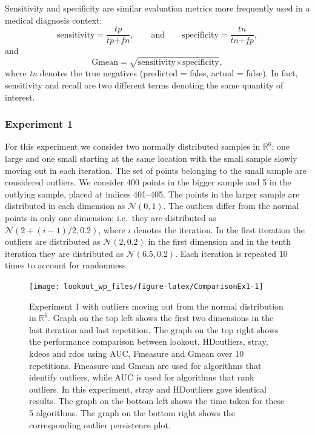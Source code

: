 \documentclass[11pt,a4paper,]{article}
\theoremstyle{definition}
\theoremstyle{definition}
\theoremstyle{definition}
\theoremstyle{remark}
\begin{document}
Sensitivity and specificity are similar evaluation metrics more frequently used in a medical diagnosis context:
\begin{equation}\label{eq:ss}
    \text{sensitivity} = \frac{ \textit{tp} }{\textit{tp} + \textit{fn}}  , \qquad \text{and} \qquad \text{specificity} = \frac{\textit{tn}}{\textit{tn} + \textit{fp}}  ,
\end{equation}
and
\begin{equation}\label{eq:gmean}
    \text{Gmean} = \sqrt{ \text{sensitivity} \times \text{specificity}}  ,
\end{equation}
where \emph{tn} denotes the true negatives (predicted = false, actual = false). In fact, sensitivity and recall are two different terms denoting the same quantity of interest.

\hypertarget{experiment-1}{%
\subsubsection*{Experiment 1}\label{experiment-1}}

For this experiment we consider two normally distributed samples in \(\mathbb{R}^6\); one large and one small starting at the same location with the small sample slowly moving out in each iteration. The set of points belonging to the small sample are considered outliers. We consider 400 points in the bigger sample and 5 in the outlying sample, placed at indices 401--405. The points in the larger sample are distributed in each dimension as \(\mathcal{N}(0, 1)\). The outliers differ from the normal points in only one dimension; i.e.~they are distributed as \(\mathcal{N}\left(2 + (i-1)/2, 0.2 \right)\), where \(i\) denotes the iteration. In the first iteration the outliers are distributed as \(\mathcal{N}\left(2, 0.2 \right)\) in the first dimension and in the tenth iteration they are distributed as \(\mathcal{N}\left(6.5, 0.2 \right)\). Each iteration is repeated 10 times to account for randomness.

\begin{figure}
\texttt{[image: lookout\_wp\_files/figure-latex/ComparisonEx1-1]} \caption{Experiment 1 with outliers moving out from the normal distribution in $\mathbb{R}^6$. Graph on the top left shows the first two dimensions in the last iteration and last repetition.  The graph on the top right shows the performance comparison between lookout, HDoutliers, stray, kdeos and rdos using AUC, Fmeasure and Gmean over 10 repetitions. Fmeasure and Gmean are used for algorithms that identify outliers, while AUC is used for algorithms that rank outliers. In this experiment, stray and HDoutliers gave identical results. The graph on the bottom left shows the time taken for these 5 algorithms. The graph on the bottom right shows the corresponding outlier persistence plot.}\label{fig:ComparisonEx1}
\end{figure}
\end{document}
